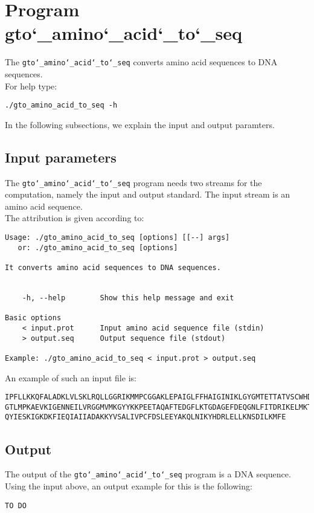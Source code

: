 \section{Program gto\char`_amino\char`_acid\char`_to\char`_seq}
The \texttt{gto\char`_amino\char`_acid\char`_to\char`_seq} converts amino acid sequences to DNA sequences.\\
For help type:
\begin{lstlisting}
./gto_amino_acid_to_seq -h
\end{lstlisting}
In the following subsections, we explain the input and output paramters.

\subsection*{Input parameters}

The \texttt{gto\char`_amino\char`_acid\char`_to\char`_seq} program needs two streams for the computation, namely the input and output standard. The input stream is an amino acid sequence.\\
The attribution is given according to:
\begin{lstlisting}
Usage: ./gto_amino_acid_to_seq [options] [[--] args]
   or: ./gto_amino_acid_to_seq [options]

It converts amino acid sequences to DNA sequences.


    -h, --help        Show this help message and exit

Basic options
    < input.prot      Input amino acid sequence file (stdin)
    > output.seq      Output sequence file (stdout)

Example: ./gto_amino_acid_to_seq < input.prot > output.seq
\end{lstlisting}
An example of such an input file is:
\begin{lstlisting}
IPFLLKKQFALADKLVLSKLRQLLGGRIKMMPCGGAKLEPAIGLFFHAIGINIKLGYGMTETTATVSCWHDFQFNPNSI
GTLMPKAEVKIGENNEILVRGGMVMKGYYKKPEETAQAFTEDGFLKTGDAGEFDEQGNLFITDRIKELMKTSNGKYIAP
QYIESKIGKDKFIEQIAIIADAKKYVSALIVPCFDSLEEYAKQLNIKYHDRLELLKNSDILKMFE
\end{lstlisting}

\subsection*{Output}

The output of the \texttt{gto\char`_amino\char`_acid\char`_to\char`_seq} program is a DNA sequence.\\
Using the input above, an output example for this is the following:
\begin{lstlisting}
TO DO
\end{lstlisting}
